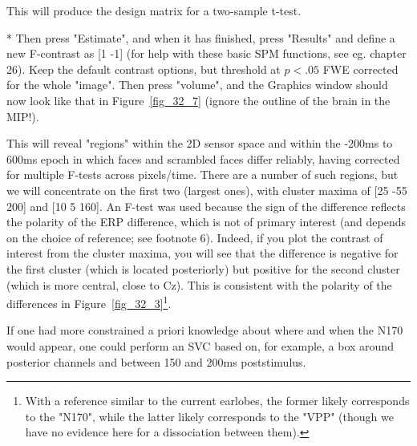 This will produce the design matrix for a two-sample t-test.

* Then press "Estimate", and when it has finished, press "Results" and define a new F-contrast as [1 -1] (for help with these basic SPM functions, see eg. chapter 26). Keep the default contrast options, but threshold at $p<.05$ FWE corrected for the whole "image". Then press "volume", and the Graphics window should now look like that in Figure~\ref{fig_32_7} (ignore the outline of the brain in the MIP!).

This will reveal "regions" within the 2D sensor space and within the -200ms to 600ms epoch in which faces and scrambled faces differ reliably, having corrected for multiple F-tests across pixels/time. There are a number of such regions, but we will concentrate on the first two (largest ones), with cluster maxima of  [25 -55 200] and [10 5 160]. An F-test was used because the sign of the difference reflects the polarity of the ERP difference, which is not of primary interest (and depends on the choice of reference; see footnote 6). Indeed, if you plot the contrast of interest from the cluster maxima, you will see that the difference is negative for the first cluster (which is located posteriorly) but positive for the second cluster (which is more central, close to Cz). This is consistent with the polarity of the differences in Figure~\ref{fig_32_3}\footnote{With a reference similar to the current earlobes, the former likely corresponds to the "N170", while the latter likely corresponds to the "VPP" (though we have no evidence here for a dissociation between them).}.

If one had more constrained a priori knowledge about where and when the N170 would appear, one could perform an SVC based on, for example, a box around posterior channels and between 150 and 200ms poststimulus.

